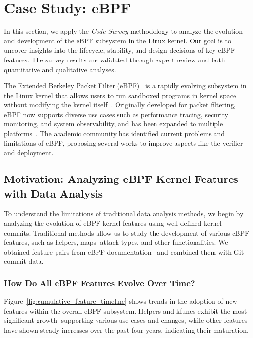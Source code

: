 \section{Case Study: eBPF}
\label{sec:analysis}

In this section, we apply the \emph{Code-Survey} methodology to analyze the evolution and development of the eBPF subsystem in the Linux kernel. Our goal is to uncover insights into the lifecycle, stability, and design decisions of key eBPF features. The survey results are validated through expert review and both quantitative and qualitative analyses.

The Extended Berkeley Packet Filter (eBPF)~\cite{ebpf} is a rapidly evolving subsystem in the Linux kernel that allows users to run sandboxed programs in kernel space without modifying the kernel itself~\cite{lim2024safebpf}. Originally developed for packet filtering, eBPF now supports diverse use cases such as performance tracing, security monitoring, and system observability, and has been expanded to multiple platforms~\cite{windows-ebpf,zheng2023bpftime}. The academic community has identified current problems and limitations of eBPF, proposing several works to improve aspects like the verifier and deployment.

\subsection{Motivation: Analyzing eBPF Kernel Features with Data Analysis}

To understand the limitations of traditional data analysis methods, we begin by analyzing the evolution of eBPF kernel features using well-defined kernel commits. Traditional methods allow us to study the development of various eBPF features, such as helpers, maps, attach types, and other functionalities. We obtained feature pairs from eBPF documentation~\cite{ebpfdocs} and combined them with Git commit data.

\subsubsection{How Do All eBPF Features Evolve Over Time?}

Figure~\ref{fig:cumulative_feature_timeline} shows trends in the adoption of new features within the overall eBPF subsystem. Helpers and kfuncs exhibit the most significant growth, supporting various use cases and changes, while other features have shown steady increases over the past four years, indicating their maturation.

